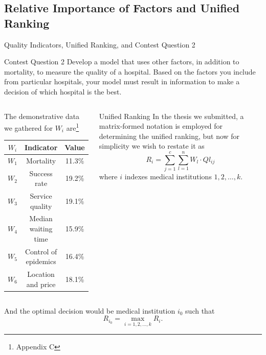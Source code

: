 \documentclass[8pt, hyperref={colorlinks=true}]{beamer}
\begin{document}
\subsection{Relative Importance of Factors and Unified Ranking}

\begin{frame}{Quality Indicators, Unified Ranking, and Contest Question 2}

\begin{block}{Contest Question 2}
Develop a model that uses other factors, in addition to mortality, to measure the quality of a hospital. Based on the factors you include from particular hospitals, your model must result in information to make a decision of which hospital is the best.
\end{block}

\begin{columns}
 
\begin{example}
The demonstrative data we gathered for $W_i$ are\footnote{Appendix C}
\begin{tabular}{c|c|c}
        $W_i$ & Indicator & Value  \\ \hline
        $W_1$ & Mortality & 11.3\% \\
        $W_2$ & Success rate & 19.2\% \\
        $W_3$ & Service quality & 19.1\% \\
        $W_4$ & Median waiting time & 15.9\% \\
        $W_5$ & Control of epidemics & 16.4\% \\
        $W_6$ & Location and price & 18.1\%
\end{tabular}
\end{example}

\begin{block}{Unified Ranking}
In the thesis we submitted, a matrix-formed notation is employed for determining the unified ranking, but now for simplicity we wish to restate it as
\[
R_i=\sum_{j=1}^c\sum_{l=1}^nW_l\cdot Ql_{ij}
\]
where $i$ indexes medical institutions $1,2,\dots,k$.
\end{block}
\end{columns}

\vspace{.15cm}

And the optimal decision would be medical institution $i_0$ such that
\[
R_{i_0}=\max_{i=1,2,\dots,k}R_i.
\]

\end{frame}
\end{document}

